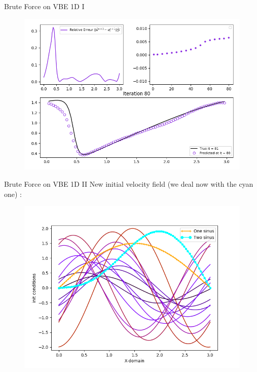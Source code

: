 \documentclass[10pt,
			   xcolor=svgnames,
			   hyperref={linkcolor=red, citecolor = DarkGreen, colorlinks=true, urlcolor=Navy}]{beamer}
\newcommand\bk{\color{black}}
\begin{document}
\begin{frame}{Brute Force on VBE 1D I}
	\begin{figure}[H]
	\centering
	\includegraphics[scale=0.42]{Pres_Last_Iteration_1.png}
	\end{figure} 
\end{frame}

\begin{frame}{Brute Force on VBE 1D II}
	New initial velocity field (we deal now with the \color{cyan} cyan \bk one) : 
\vspace{-0.3cm}	
	\begin{figure}[H]
	\centering
	\includegraphics[scale=0.5]{Initialisation_cases_Last.png}
	\end{figure}
\end{frame}
\end{document}
